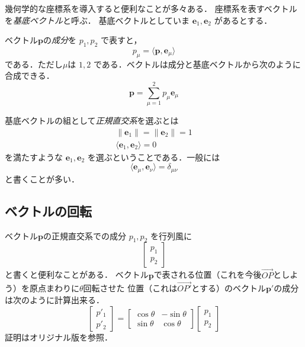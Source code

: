 \documentclass{jsbook}
\newcommand{\keyword}[1]{\emph{#1}}
\newcommand{\norm}[1]{\|{#1}\|}
\newcommand{\bvec}[1]{\boldsymbol{#1}}
\begin{document}
幾何学的な座標系を導入すると便利なことが多々ある．
座標系を表すベクトルを\keyword{基底ベクトル}と呼ぶ．
基底ベクトルとしていま $\bvec{e}_1,\bvec{e}_2$ があるとする．

ベクトル$\bvec{p}$の\keyword{成分}を $p_1,p_2$ で表すと，
\begin{equation}
p_\mu=\langle\bvec{p},\bvec{e}_\mu\rangle
\end{equation}
である．ただし$\mu$は $1,2$ である．ベクトルは成分と基底ベクトルから次のように合成できる．
\begin{equation}
\bvec{p}=\sum_{\mu=1}^2p_\mu\bvec{e}_\mu
\end{equation}

基底ベクトルの組として\keyword{正規直交系}を選ぶとは
\begin{gather}
\norm{\bvec{e}_1}=\norm{\bvec{e}_2}=1\\
\langle\bvec{e}_1,\bvec{e}_2\rangle=0
\end{gather}
を満たすような $\bvec{e}_1,\bvec{e}_2$ を選ぶということである．一般には
\begin{equation}
\langle\bvec{e}_\mu,\bvec{e}_\nu\rangle=\delta_{\mu\nu}
\end{equation}
と書くことが多い．

\subsection{ベクトルの回転}

ベクトル$\bvec{p}$の正規直交系での成分 $p_1,p_2$ を行列風に
\begin{equation}
\begin{bmatrix}p_1\\p_2\end{bmatrix}
\end{equation}
と書くと便利なことがある．
ベクトル$\bvec{p}$で表される位置（これを今後$\overrightarrow{OP}$としよう）を原点まわりに$\theta$回転させた
位置（これは$\overrightarrow{OP'}$とする）のベクトル$\bvec{p}'$の成分は次のように計算出来る．
\begin{equation}
\begin{bmatrix}p'_1\\p'_2\end{bmatrix}=\begin{bmatrix}\cos\theta&-\sin\theta\\\sin\theta&\cos\theta\end{bmatrix}\begin{bmatrix}p_1\\p_2\end{bmatrix}
\end{equation}
証明はオリジナル版を参照．
\end{document}
